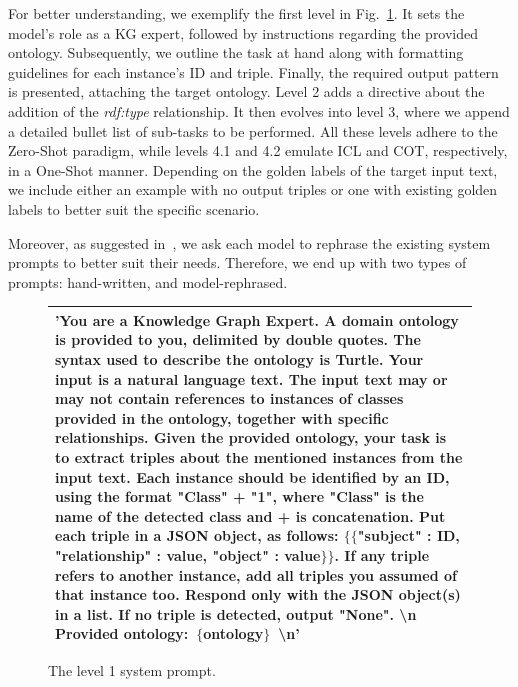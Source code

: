 \documentclass[runningheads]{llncs}
\begin{document}
For better understanding, we exemplify the first level in Fig.~\ref{fig:l1prompting}. It sets the model’s role  as a KG expert, followed by instructions regarding the provided ontology. Subsequently, we outline the task at hand along with formatting guidelines for each instance’s ID and triple. Finally, the required output pattern is presented, attaching the target ontology. Level 2 adds a directive about the addition of the \textit{rdf:type} relationship. It then evolves into level 3, where we append a detailed bullet list of sub-tasks to be performed. All these levels adhere to the Zero-Shot paradigm, while levels 4.1 and 4.2 emulate ICL and COT, respectively, in a One-Shot manner. Depending on the golden labels of the target input text, we include either an example with no output triples or one with existing golden labels to better suit the specific scenario.

Moreover, as suggested in~\cite{pan2023}, we ask each model to rephrase the existing system prompts to better suit their needs. Therefore, we end up with two types of prompts: hand-written, and model-rephrased.


\begin{figure}[!tb]
\scriptsize
\begin{tabular}{|p{12cm}|}
\hline
'You are a Knowledge Graph Expert. A domain ontology is provided to you, delimited by double quotes.
	 The syntax used to describe the ontology is Turtle. Your input is a natural language text.
	 The input text may or may not contain references to instances of classes provided in the ontology, together with specific relationships.
	 Given the provided ontology, your task is to extract triples about the mentioned instances from the input text.
	 Each instance should be identified by an ID, using the format "Class" + "1",
		where "Class" is the name of the detected class and + is concatenation.
	 Put each triple in a JSON object, as follows: $\{\{$"subject" : ID, "relationship" : value, "object" : value$\}\}$.
	 If any triple refers to another instance, add all triples you assumed of that instance too.
	 Respond only with the JSON object(s) in a list.
	If no triple is detected, output "None". \textbackslash n
	Provided ontology: $\{$ontology$\}$ \textbackslash n' \\
	\hline
\end{tabular}
\caption{The level 1 system prompt.}%
\label{fig:l1prompting}%
\end{figure}


\end{document}
